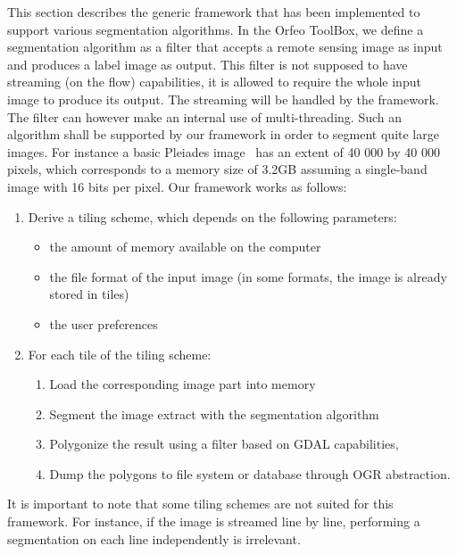 \documentclass{josis}
\begin{document}
This section describes the generic framework that has been implemented
to support various segmentation algorithms. In the Orfeo ToolBox, we
define a segmentation algorithm as a filter that accepts a remote
sensing image as input and produces a label image as output. This
filter is not supposed to have streaming (on the flow) capabilities,
it is allowed to require the whole input image to produce its
output. The streaming will be handled by the framework. The filter can
however make an internal use of multi-threading.  Such an algorithm
shall be supported by our framework in order to segment quite large
images. For instance a basic Pleiades image~\cite{tinel2012orfeo} has
an extent of 40 000 by 40 000 pixels, which corresponds to a memory
size of 3.2GB assuming a single-band image with 16 bits per pixel.
Our framework works as follows:
\begin{enumerate}[1 - ]
\item Derive a tiling scheme, which depends on the following
  parameters:
\begin{itemize}
\item the amount of memory available on the computer
\item the file format of the input image (in some formats,
the image is already stored in tiles)
\item the user preferences
\end{itemize}
\item For each tile of the tiling scheme:
\begin{enumerate}[a - ]
\item Load the corresponding image part into memory
\item Segment the image extract with the segmentation algorithm
\item Polygonize the result using a filter based on GDAL capabilities,
\item Dump the polygons to file system or database through OGR
      abstraction.
\end{enumerate}
\end{enumerate}

It is important to note that some tiling schemes are not suited for
this framework. For instance, if the image is streamed line by line,
performing a segmentation on each line independently is irrelevant.
\end{document}
